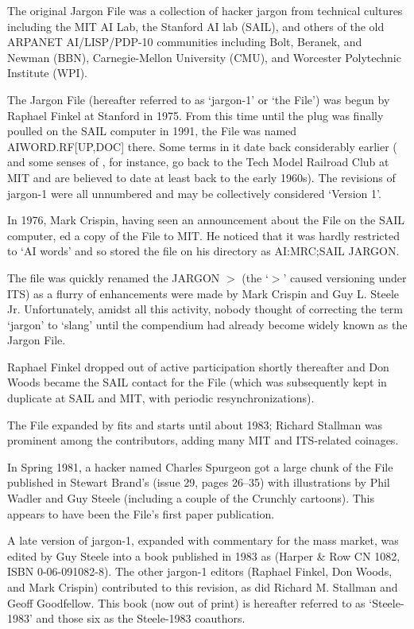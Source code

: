 The original Jargon File was a collection of hacker jargon from technical cultures including the MIT AI Lab, the Stanford AI lab (SAIL),
and others of the old ARPANET AI/LISP/PDP-10 communities including Bolt, Beranek, and Newman (BBN), Carnegie-Mellon University (CMU), and
Worcester Polytechnic Institute (WPI).

The Jargon File (hereafter referred to as `jargon-1' or `the File') was begun by Raphael Finkel at Stanford in 1975. From this time until
the plug was finally poulled on the SAIL computer in 1991, the File was named AIWORD.RF[UP,DOC] there. Some terms in it date back
considerably earlier ( and some senses of , for instance, go back to the Tech Model Railroad Club at MIT
and are believed to date at least back to the early 1960s). The revisions of jargon-1 were all unnumbered and may be collectively
considered `Version 1'.

In 1976, Mark Crispin, having seen an announcement about the File on the SAIL computer, ed a copy of the File to MIT. He
noticed that it was hardly restricted to `AI words' and so stored the file on his directory as AI:MRC;SAIL JARGON.

The file was quickly renamed the JARGON $>$ (the `$>$' caused versioning under ITS) as a flurry of enhancements were made by Mark Crispin
and Guy L. Steele Jr. Unfortunately, amidst all this activity, nobody thought of correcting the term `jargon' to `slang' until the
compendium had already become widely known as the Jargon File.

Raphael Finkel dropped out of active participation shortly thereafter and Don Woods became the SAIL contact for the File (which was
subsequently kept in duplicate at SAIL and MIT, with periodic resynchronizations).

The File expanded by fits and starts until about 1983; Richard Stallman was prominent among the contributors, adding many MIT and
ITS-related coinages.

In Spring 1981, a hacker named Charles Spurgeon got a large chunk of the File published in Stewart Brand's
 (issue 29, pages 26--35) with illustrations by Phil Wadler and Guy Steele (including a couple of the
Crunchly cartoons). This appears to have been the File's first paper publication.

A late version of jargon-1, expanded with commentary for the mass market, was edited by Guy Steele into a book published in 1983 as
 (Harper \& Row CN 1082, ISBN 0-06-091082-8). The other jargon-1 editors (Raphael Finkel, Don Woods,
and Mark Crispin) contributed to this revision, as did Richard M. Stallman and Geoff Goodfellow. This book (now out of print) is
hereafter referred to as `Steele-1983' and those six as the Steele-1983 coauthors.

